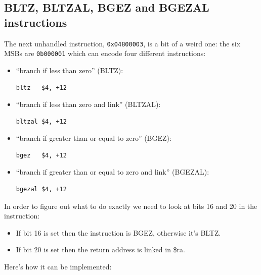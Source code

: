 \documentclass[a4paper]{article}
\newcommand{\code}[1] {\texttt{#1}}
\begin{document}
\subsection{BLTZ, BLTZAL, BGEZ and BGEZAL instructions}

The next unhandled instruction, \code{0x04800003}, is a bit of a weird
one: the six MSBs are \code{0b000001} which can encode four different
instructions:

\begin{itemize}
\item ``branch if less than zero'' (BLTZ):

  \begin{lstlisting}[language=assembly]
bltz   $4, +12
  \end{lstlisting}

\item ``branch if less than zero and link'' (BLTZAL):

  \begin{lstlisting}[language=assembly]
bltzal $4, +12
  \end{lstlisting}

\item ``branch if greater than or equal to zero'' (BGEZ):
  \begin{lstlisting}[language=assembly]
bgez   $4, +12
  \end{lstlisting}


\item ``branch if greater than or equal to zero and link'' (BGEZAL):

  \begin{lstlisting}[language=assembly]
bgezal $4, +12
  \end{lstlisting}

\end{itemize}

In order to figure out what to do exactly we need to look at bits 16
and 20 in the instruction:

\begin{itemize}
\item If bit 16 is set then the instruction is BGEZ, otherwise it's
  BLTZ.

\item If bit 20 is set then the return address is linked in \$ra.
\end{itemize}

Here's how it can be implemented:
\end{document}
